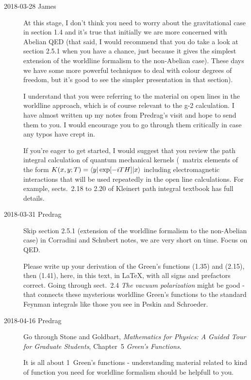 \begin{description}
\item[2018-03-28 James]
At this
stage, I don't think you need to worry about the gravitational case in section
1.4 and it's true that initially we are more concerned with Abelian QED (that
said, I would recommend that you do take a look at section 2.5.1 when you have
a chance, just because it gives the simplest extension of the worldline
formalism to the non-Abelian case). These days we have some more powerful
techniques to deal with colour degrees of freedom, but it's good to see the
simpler presentation in that section).

I understand that you were referring to the material on open lines in the
worldline approach, which is of course relevant to the g-2 calculation. I
have almost written up my notes from Predrag's visit and hope to send
them to you. I would encourage you to go through them critically in case
any typos have crept in.

If you're eager to get started, I would suggest that you
review the path integral calculation of quantum mechanical kernels (\ie\ matrix
elements of the form $K(x, y; T) = \bra{y} \exp[-i T H] \ket{x}$ including
electromagnetic interactions that will be used repeatedly in the open line
calculations. For example, sects.~2.18 to 2.20 of Kleinert path
integral textbook has full details.

\item[2018-03-31 Predrag]
Skip section 2.5.1 (extension of the worldline formalism to the non-Abelian
case) in Corradini and Schubert notes, we are very short on time.
Focus on QED.

Please write up your derivation of the Green's functions (1.35)
and (2.15), then (1.41), here, in this text, in LaTeX, with all signs and
prefactors correct. Going
through sect.~2.4 {\em The vacuum polarization} might be good - that
connects these mysterious worldline Green's functions to the standard
Feynman integrals like those you see in Peskin and Schroeder.

\item[2018-04-16 Predrag] %
Go through
Stone and Goldbart, {\em Mathematics for Physics: A Guided Tour
for Graduate Students}, Chapter~5  \emph{Green's Functions}.

It is all about 1\dmn\ Green's functions - understanding material related to
kind of function you need for worldline formalism should be helpfull to you.


\end{description}
